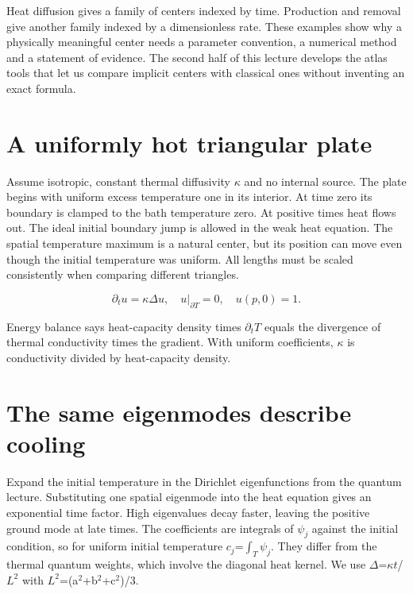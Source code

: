 \documentclass[11pt,oneside,openany]{book}
\begin{document}
Heat diffusion gives a family of centers indexed by time. Production and removal give another family indexed by a dimensionless rate. These examples show why a physically meaningful center needs a parameter convention, a numerical method and a statement of evidence. The second half of this lecture develops the atlas tools that let us compare implicit centers with classical ones without inventing an exact formula.


\section{A uniformly hot triangular plate}\label{sec:slide62}

Assume isotropic, constant thermal diffusivity \ensuremath{\kappa} and no internal source. The plate begins with uniform excess temperature one in its interior. At time zero its boundary is clamped to the bath temperature zero. At positive times heat flows out. The ideal initial boundary jump is allowed in the weak heat equation. The spatial temperature maximum is a natural center, but its position can move even though the initial temperature was uniform. All lengths must be scaled consistently when comparing different triangles.


\[\partial_tu=\kappa\Delta u,\quad u|_{\partial T}=0,\quad u(p,0)=1.\]


Energy balance says heat-capacity density times $\partial_t T$ equals the divergence of thermal conductivity times the gradient. With uniform coefficients, \ensuremath{\kappa} is conductivity divided by heat-capacity density.



\section{The same eigenmodes describe cooling}\label{sec:slide63}

Expand the initial temperature in the Dirichlet eigenfunctions from the quantum lecture. Substituting one spatial eigenmode into the heat equation gives an exponential time factor. High eigenvalues decay faster, leaving the positive ground mode at late times. The coefficients are integrals of $\psi_j$ against the initial condition, so for uniform initial temperature $c_j$=$\int_T\psi_j$. They differ from the thermal quantum weights, which involve the diagonal heat kernel. We use \ensuremath{\Delta}=$\kappa t$/$L^2$ with $L^2$=(a\ensuremath{^2}+b\ensuremath{^2}+c\ensuremath{^2})/3.
\end{document}
